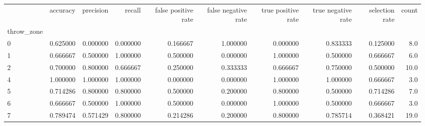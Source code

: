 \begin{tabular}{lrrrrrrrrr}
\toprule
{} &  accuracy &  precision &    recall &  false positive rate &  false negative rate &  true positive rate &  true negative rate &  selection rate &  count \\
throw\_zone &           &            &           &                      &                      &                     &                     &                 &        \\
\midrule
0          &  0.625000 &   0.000000 &  0.000000 &             0.166667 &             1.000000 &            0.000000 &            0.833333 &        0.125000 &    8.0 \\
1          &  0.666667 &   0.500000 &  1.000000 &             0.500000 &             0.000000 &            1.000000 &            0.500000 &        0.666667 &    6.0 \\
2          &  0.700000 &   0.800000 &  0.666667 &             0.250000 &             0.333333 &            0.666667 &            0.750000 &        0.500000 &   10.0 \\
4          &  1.000000 &   1.000000 &  1.000000 &             0.000000 &             0.000000 &            1.000000 &            1.000000 &        0.666667 &    3.0 \\
5          &  0.714286 &   0.800000 &  0.800000 &             0.500000 &             0.200000 &            0.800000 &            0.500000 &        0.714286 &    7.0 \\
6          &  0.666667 &   0.500000 &  1.000000 &             0.500000 &             0.000000 &            1.000000 &            0.500000 &        0.666667 &    3.0 \\
7          &  0.789474 &   0.571429 &  0.800000 &             0.214286 &             0.200000 &            0.800000 &            0.785714 &        0.368421 &   19.0 \\
\bottomrule
\end{tabular}
